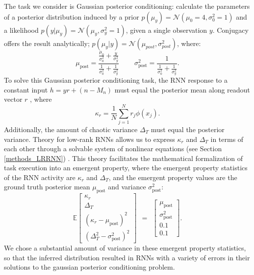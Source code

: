 \documentclass[11pt]{article}
\begin{document}
The task we consider is Gaussian posterior conditioning: calculate the parameters of a posterior distribution induced by a prior $p(\mu_y) = \mathcal{N}(\mu_0=4, \sigma_0^2=1)$ and a likelihood $p(y | \mu_y) = \mathcal{N}(\mu_y,\sigma^2_y = 1)$, given a single observation $y$.  
Conjugacy offers the result analytically; $p(\mu_y | y ) = \mathcal{N}\left(\mu_{post},\sigma_{post}^2\right)$, where:   
\begin{equation}
\mu_{\text{post}} = \frac{\frac{\mu_0}{\sigma_0^2} + \frac{y}{\sigma_y^2}}{\frac{1}{\sigma_0^2} + \frac{1}{\sigma_y^2}}
~~~~~~~~~~
 \sigma^2_{\text{post}} = \frac{1}{\frac{1}{\sigma_0^2} + \frac{1}{\sigma_y^2}}.
\end{equation} 
To solve this Gaussian posterior conditioning task, the RNN response to a constant input $h = y r + (n-M_n)$ must equal the posterior mean along readout vector $r$ , where
\begin{equation}
\kappa_r =  \frac{1}{N} \sum_{j=1}^N r_j \phi(x_j).
\end{equation}
Additionally, the amount of chaotic variance $\Delta_T$ must equal the posterior variance.
Theory for low-rank RNNs allows us to express $\kappa_r$ and $\Delta_T$ in terms of each other through a solvable system of nonlinear equations  (see Section \ref{methods_LRRNN}) \cite{mastrogiuseppe2018linking}.
This theory facilitates the mathematical formalization of task execution into an emergent property, where the emergent property statistics of the RNN activity are $\kappa_r$ and $\Delta_T$, and the emergent property values are the ground truth posterior mean $\mu_{\text{post}}$ and variance $\sigma^2_{\text{post}}$:
\begin{equation}
\mathbb{E} \begin{bmatrix} \kappa_r \\ \Delta_T \\ (\kappa_r-\mu_{\text{post}})^2 \\ (\Delta_T^2-\sigma^2_{\text{post}})^2 \end{bmatrix} ~~=~~ \begin{bmatrix} \mu_{\text{post}} \\ \sigma^2_{\text{post}} \\ 0.1 \\ 0.1 \end{bmatrix}.
\end{equation}
We chose a substantial amount of variance in these emergent property statistics, so that the inferred distribution resulted in RNNs with a variety of errors in their solutions to the gaussian posterior conditioning problem. 
\end{document}
